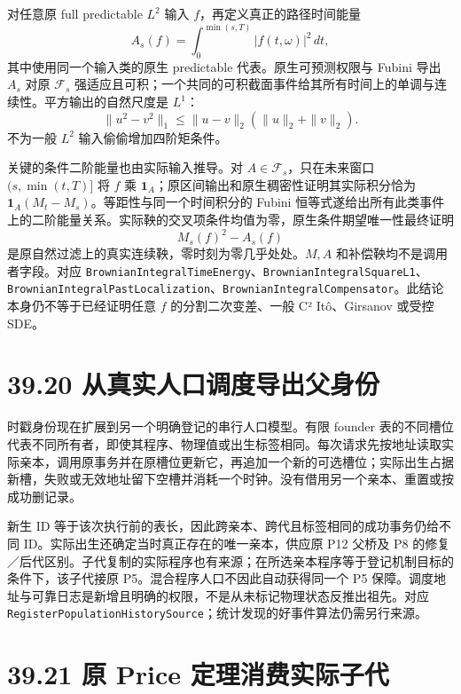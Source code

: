 \documentclass[
  11pt,
  oneside]{book}
\begin{document}
对任意原 full predictable \(L^2\) 输入 \(f\)，再定义真正的路径时间能量 \[A_s(f)=\int_0^{\min(s,T)}|f(t,\omega)|^2\,dt,\] 其中使用同一个输入类的原生 predictable 代表。原生可预测权限与 Fubini 导出 \(A_s\) 对原 \(\mathcal F_s\) 强适应且可积；一个共同的可积截面事件给其所有时间上的单调与连续性。平方输出的自然尺度是 \(L^1\)： \[\|u^2-v^2\|_1\le\|u-v\|_2(\|u\|_2+\|v\|_2).\] 不为一般 \(L^2\) 输入偷偷增加四阶矩条件。

关键的条件二阶能量也由实际输入推导。对 \(A\in\mathcal F_s\)，只在未来窗口 \((s,\min(t,T)]\) 将 \(f\) 乘 \(\mathbf1_A\)；原区间输出和原生稠密性证明其实际积分恰为 \(\mathbf1_A(M_t-M_s)\)。等距性与同一个时间积分的 Fubini 恒等式遂给出所有此类事件上的二阶能量关系。实际鞅的交叉项条件均值为零，原生条件期望唯一性最终证明 \[M_s(f)^2-A_s(f)\] 是原自然过滤上的真实连续鞅，零时刻为零几乎处处。\(M,A\) 和补偿鞅均不是调用者字段。对应 \nolinkurl{BrownianIntegralTimeEnergy}、\nolinkurl{BrownianIntegralSquareL1}、\nolinkurl{BrownianIntegralPastLocalization}、\nolinkurl{BrownianIntegralCompensator}。此结论本身仍不等于已经证明任意 \(f\) 的分割二次变差、一般 C² Itô、Girsanov 或受控 SDE。

\section{39.20 从真实人口调度导出父身份}\label{ux4eceux771fux5b9eux4ebaux53e3ux8c03ux5ea6ux5bfcux51faux7236ux8eabux4efd}

时戳身份现在扩展到另一个明确登记的串行人口模型。有限 founder 表的不同槽位代表不同所有者，即使其程序、物理值或出生标签相同。每次请求先按地址读取实际亲本，调用原事务并在原槽位更新它，再追加一个新的可选槽位；实际出生占据新槽，失败或无效地址留下空槽并消耗一个时钟。没有借用另一个亲本、重置或按成功删记录。

新生 ID 等于该次执行前的表长，因此跨亲本、跨代且标签相同的成功事务仍给不同 ID。实际出生还确定当时真正存在的唯一亲本，供应原 P12 父桥及 P8 的修复／后代区别。子代复制的实际程序也有来源；在所选亲本程序等于登记机制目标的条件下，该子代接原 P5。混合程序人口不因此自动获得同一个 P5 保障。调度地址与可靠日志是新增且明确的权限，不是从未标记物理状态反推出祖先。对应 \nolinkurl{RegisterPopulationHistorySource}；统计发现的好事件算法仍需另行来源。

\section{39.21 原 Price 定理消费实际子代}\label{ux539f-price-ux5b9aux7406ux6d88ux8d39ux5b9eux9645ux5b50ux4ee3}
\end{document}
